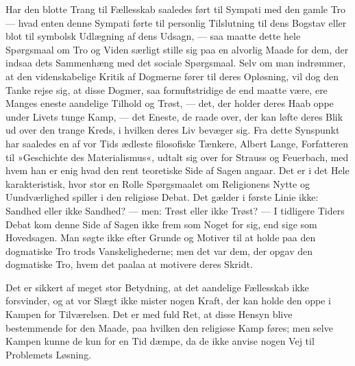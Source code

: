 \documentclass[12pt,a4paper]{article}
\newcommand{\apage}[1]{\marginnote{\footnotesize\textit{[#1]}}}
\begin{document}
Har den blotte Trang til Fællesskab saaledes ført \apage{208} til Sympati med den gamle Tro --- hvad
enten denne Sympati førte til personlig Tilslutning til dens Bogstav eller blot til
symbolsk Udlægning af dens Udsagn, --- saa maatte dette hele Spørgsmaal om Tro og Viden
særligt stille sig paa en alvorlig Maade for dem, der indsaa dets Sammenhæng med det sociale
Spørgsmaal. Selv om man indrømmer, at den videnskabelige Kritik af Dogmerne fører til deres
Opløsning, vil dog den Tanke rejse sig, at disse Dogmer, saa fornuftstridige de end maatte
være, ere Manges eneste aandelige Tilhold og Trøst, --- det, der holder deres Haab oppe under
Livets tunge Kamp, --- det Eneste, de raade over, der kan løfte deres Blik ud over den trange
Kreds, i hvilken deres Liv bevæger sig. Fra dette Synspunkt har saaledes en af vor Tids
ædleste filosofiske Tænkere, Albert Lange, Forfatteren til »Geschichte des Materialismus«,
udtalt sig over for Strauss og Feuerbach, med hvem han er enig hvad den rent teoretiske Side
af Sagen angaar. Det er i det Hele karakteristisk, hvor stor en Rolle Spørgsmaalet om
Religionens Nytte og Uundværlighed spiller i den religiøse Debat. Det gælder i første Linie
ikke: Sandhed eller ikke Sandhed? --- men: Trøst eller ikke Trøst? --- I tidligere Tiders
Debat kom denne Side af Sagen ikke frem som Noget for sig, end sige som Hovedsagen. Man søgte
ikke efter Grunde og Motiver til at holde paa den dogmatiske Tro trods Vanskelighederne; men
det var dem, der opgav den dogmatiske Tro, hvem det paalaa at motivere deres Skridt.

Det er sikkert af meget stor Betydning, at det aandelige Fællesskab ikke forsvinder, og at
vor Slægt ikke mister nogen Kraft, der kan holde den oppe i Kampen for Tilværelsen. Det er
med fuld Ret, at disse Hensyn blive bestemmende for den Maade, paa hvilken den religiøse Kamp
føres; men selve Kampen kunne de kun for en Tid dæmpe, da de ikke anvise nogen Vej til
Problemets Løsning.
\end{document}
